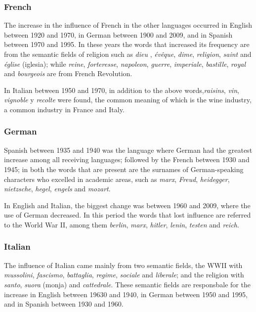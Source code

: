 \documentclass[10pt,letterpaper]{article} %
\begin{document}
\subsubsection*{French} %

The increase in the influence of French in the other languages occurred in English between 1920 and 1970, in German between 1900 and 2009, and in Spanish between 1970 and 1995. In these years the words that increased its frequency are from the semantic fields of religion such as \textit{dieu} , \textit{évêque}, \textit{dime}, \textit{religion}, \textit{saint} and \textit{église} (iglesia); while \textit{reine}, \textit{forteresse}, \textit{napoleon}, \textit{guerre}, \textit{imperiale}, \textit{bastille}, \textit{royal} and \textit{bourgeois} are from French Revolution.

In Italian between 1950 and 1970, in addition to the above words,\textit{raisins}, \textit{vin}, \textit{vignoble} y \textit{recolte} were found, the common meaning of which is the wine industry, a common industry in France and Italy.

\subsubsection*{German} %

Spanish between 1935 and 1940 was the language where German had the greatest increase among all receiving languages; followed by the French between 1930 and 1945; in both  the words that are present are the surnames of German-speaking characters who excelled in academic areas, such as \textit{marx}, \textit{Freud}, \textit{heidegger}, \textit{nietzsche}, \textit{hegel}, \textit{engels} and \textit{mozart}.

In English and Italian, the biggest change was between 1960 and 2009, where the use of German decreased. In this period the words that lost influence are referred to the World War II, among them \textit{berlin}, \textit{marx}, \textit{hitler}, \textit{lenin}, \textit{testen}  and \textit{reich}.
\subsubsection*{Italian} %
 
 
The influence of Italian came mainly from two semantic fields, the WWII 
with \textit{mussolini}, \textit{fascismo}, \textit{battaglia}, \textit{regime}, \textit{sociale} and \textit{liberale}; and the religion with \textit{santo}, \textit{suora} (monja) and \textit{cattedrale}. These semantic fields are responsbale for the increase in English between 19630 and 1940, in German between 1950 and 1995, and in Spanish between 1930 and 1960.
 
\end{document}

